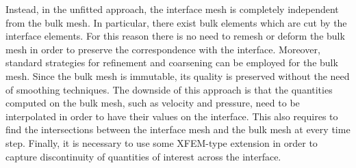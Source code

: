 Instead, in the unfitted approach, the interface mesh is completely independent
from the bulk mesh. In particular, there exist bulk elements which are cut by
the interface elements. For this reason there is no need to remesh or deform
the bulk mesh in order to preserve the correspondence with the interface.
Moreover, standard strategies for refinement and coarsening can be employed for
the bulk mesh. Since the bulk mesh is immutable, its quality is preserved
without the need of smoothing techniques. The downside of this approach is that
the quantities computed on the bulk mesh, such as velocity and pressure, need
to be interpolated in order to have their values on the interface. This also
requires to find the intersections between the interface mesh and the bulk mesh
at every time step. Finally, it is necessary to use some XFEM-type extension in
order to capture discontinuity of quantities of interest across the interface.

